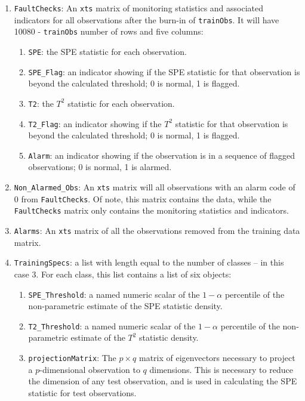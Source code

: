 \documentclass{report}\usepackage[]{graphicx}\usepackage[]{color}
\begin{document}
\begin{enumerate}
\item \texttt{FaultChecks}: An \texttt{xts} matrix of monitoring statistics and associated indicators for all observations after the burn-in of \texttt{trainObs}. It will have 10080 - \texttt{trainObs} number of rows and five columns:
	\begin{enumerate}
	\item \texttt{SPE}: the SPE statistic for each observation.
    \item \texttt{SPE\_Flag}: an indicator showing if the SPE statistic for that observation is beyond the calculated threshold; 0 is normal, 1 is flagged.
    \item \texttt{T2}: the $T^2$ statistic for each observation.
    \item \texttt{T2\_Flag}: an indicator showing if the $T^2$ statistic for that observation is beyond the calculated threshold; 0 is normal, 1 is flagged.
    \item \texttt{Alarm}: an indicator showing if the observation is in a sequence of flagged observations; 0 is normal, 1 is alarmed.
	\end{enumerate}
%
\item \texttt{Non\_Alarmed\_Obs}: An \texttt{xts} matrix will all observations with an alarm code of 0 from \texttt{FaultChecks}. Of note, this matrix contains the data, while the \texttt{FaultChecks} matrix only contains the monitoring statistics and indicators.
%
\item \texttt{Alarms}: An \texttt{xts} matrix of all the observations removed from the training data matrix.
%
\item \texttt{TrainingSpecs}: a list with length equal to the number of classes -- in this case 3. For each class, this list contains a list of six objects:
	\begin{enumerate}
	\item \texttt{SPE\_Threshold}: a named numeric scalar of the $1 - \alpha$ percentile of the non-parametric estimate of the SPE statistic density.
    \item \texttt{T2\_Threshold}: a named numeric scalar of the $1 - \alpha$ percentile of the non-parametric estimate of the $T^2$ statistic density.
    \item \texttt{projectionMatrix}: The $p \times q$ matrix of eigenvectors necessary to project a $p$-dimensional observation to $q$ dimensions. This is necessary to reduce the dimension of any test observation, and is used in calculating the SPE statistic for test observations.

\end{enumerate}
\end{enumerate}
\end{document}
